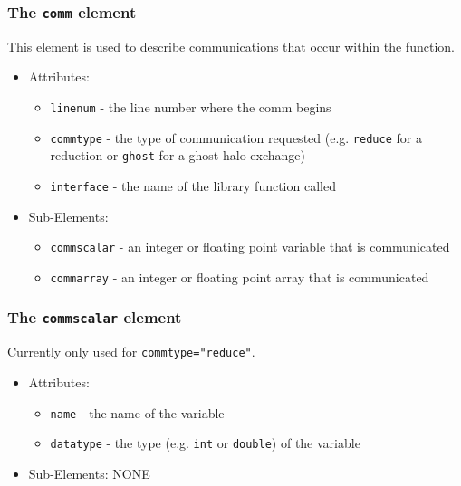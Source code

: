 \documentclass{article}
\begin{document}
\subsubsection{The {\tt comm} element}
  This element is used to describe communications that occur within
  the function.
  \begin{itemize}
    \item Attributes:
    \begin{itemize}
      \item {\tt linenum} - the line number where the comm begins
      \item {\tt commtype} - the type of communication requested
        (e.g. {\tt reduce} for a reduction or {\tt ghost} for a ghost
        halo exchange)
      \item {\tt interface} - the name of the library function called
    \end{itemize}
    \item Sub-Elements:
    \begin{itemize}
      \item {\tt commscalar} - an integer or floating point variable that
        is communicated
      \item {\tt commarray} - an integer or floating point array that is
        communicated
    \end{itemize}
  \end{itemize}

\subsubsection{The {\tt commscalar} element}
  Currently only used for {\tt commtype="reduce"}.
  \begin{itemize}
    \item Attributes:
    \begin{itemize}
      \item {\tt name} - the name of the variable
      \item {\tt datatype} - the type (e.g. {\tt int} or {\tt double})
        of the variable
    \end{itemize}
    \item Sub-Elements: NONE
  \end{itemize}
\end{document}
